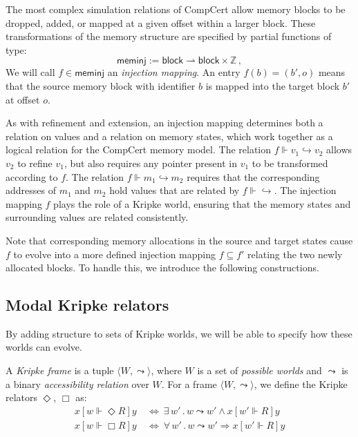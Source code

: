 \documentclass[sigplan,10pt,review,anonymous]{acmart}\settopmatter{printfolios=true,printccs=false,printacmref=false}
\newcommand{\kw}[1]{\ensuremath{ \mathsf{#1} }}
\newcommand{\ifr}[1]{\mathrel{[{#1}]}}
\begin{document}
The most complex simulation relations of CompCert
allow memory blocks to be dropped, added, or
mapped at a given offset within a larger block.
These transformations of the memory structure
are specified by partial functions of type:
\[
  \kw{meminj} := \kw{block} \rightharpoonup \kw{block} \times \mathbb{Z} \,,
\]
We will call $f \in \kw{meminj}$
an \emph{injection mapping}.
An entry $f(b) = (b', o)$
means that the source memory block with identifier $b$
is mapped into the target block $b'$
at offset $o$.

As with refinement and extension,
an injection mapping determines both
a relation on values and
a relation on memory states,
which work together
as a logical relation for the CompCert memory model.
The relation $f \Vdash v_1 \hookrightarrow v_2$
allows $v_2$ to refine $v_1$,
but also requires any pointer present in $v_1$ 
to be transformed according to $f$.
The relation $f \Vdash m_1 \hookrightarrow m_2$
requires that the corresponding addresses of $m_1$ and $m_2$
hold values that are related by $f \Vdash {\hookrightarrow}$.
The injection mapping $f$ plays the role of a Kripke world,
ensuring that the memory states and surrounding values
are related consistently.

Note that corresponding memory allocations
in the source and target states cause $f$ to
evolve into a more defined injection mapping $f \subseteq f'$
relating the two newly allocated blocks.
To handle this,
we introduce the following constructions.


\subsection{Modal Kripke relators} %

By adding structure to sets of Kripke worlds,
we will be able to
specify how these worlds can evolve.

\begin{definition} %
A \emph{Kripke frame} is a tuple
$\langle W, {\leadsto} \rangle$, where
$W$ is a set of \emph{possible worlds} and
$\leadsto$ is a
binary \emph{accessibility relation} over $W$.
For a frame
$\langle W, \leadsto \rangle$,
we define the Kripke relators $\Diamond$, $\Box$ as:
\begin{align*}
  x \ifr{w \Vdash \Diamond R} y & \: \Leftrightarrow \:
    \exists \, w' \,.\, w \leadsto w' \wedge
      x \ifr{w' \Vdash R} y \\
  x \ifr{w \Vdash \Box R} y & \: \Leftrightarrow \:
    \forall \, w' \,.\, w \leadsto w' \Rightarrow
      x \ifr{w' \Vdash R} y
\end{align*}
\end{definition}
\end{document}
